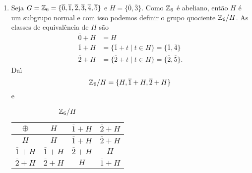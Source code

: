 \begin{exemplos}
\begin{enumerate}[label={\arabic*})]
        \item Seja $G = \mathbb{Z}_6 = \{\overline{0}, \overline{1}, \overline{2}, \overline{3}, \overline{4}, \overline{5}\}$ e $H = \{\overline{0}, \overline{3}\}$. Como $\mathbb{Z}_6$ \'e abeliano, ent\~ao $H$ \'e um subgrupo normal e com isso podemos definir o grupo quociente $\mathbb{Z}_6/H$. As classes de equival\^encia de $H$ s\~ao
        \begin{align*}
            \overline{0} + H &= H\\
            \overline{1} + H &= \{\overline{1} + t \mid t \in H\} = \{\overline{1}, \overline{4}\}\\
            \overline{2} + H &= \{\overline{2} + t \mid t \in H\} = \{\overline{2}, \overline{5}\}.
        \end{align*}
        Da{\'\i}
        \[
            \mathbb{Z}_6/H = \{H, \overline{1} + H, \overline{2} + H\}
        \]
        e
        \begin{center}
            \begin{table}[htp]
                \centering
                \caption{$\mathbb{Z}_6/H$}
                \begin{tabular}{|c|c|c|c|}
                    \hline
                    $\oplus$ & $H$ & $\overline{1} + H$ & $\overline{2} + H$\\
                    \hline
                    $H$ & $H$ & $\overline{1} + H$ & $\overline{2} + H$\\
                    \hline
                    $\overline{1} + H$ & $\overline{1} + H$ & $\overline{2} + H$ & $H$\\
                    \hline
                    $\overline{2} + H$ & $\overline{2} + H$ & $H$ & $\overline{1} + H$\\
                    \hline
                \end{tabular}
            \end{table}
        \end{center}



\end{enumerate}
\end{exemplos}
